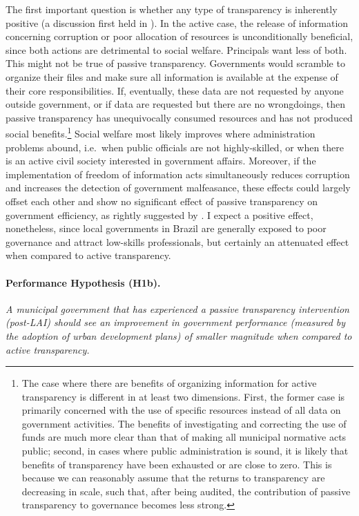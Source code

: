 \documentclass[11pt]{article}
\begin{document}
The first important question is whether any type of transparency is inherently positive (a discussion first held in \citet{PratWrongKindTransparency2005}). In the active case, the release of information concerning corruption or poor allocation of resources is unconditionally beneficial, since both actions are detrimental to social welfare. Principals want less of both. This might not be true of passive transparency. Governments would scramble to organize their files and make sure all information is available at the expense of their core responsibilities. If, eventually, these data are not requested by anyone outside government, or if data are requested but there are no wrongdoings, then passive transparency has unequivocally consumed resources and has not produced social benefits.\footnote{The case where there are benefits of organizing information for active transparency is different in at least two dimensions. First, the former case is primarily concerned with the use of specific resources instead of all data on government activities. The benefits of investigating and correcting the use of funds are much more clear than that of making all municipal normative acts public; second, in cases where public administration is sound, it is likely that benefits of transparency have been exhausted or are close to zero. This is because we can reasonably assume that the returns to transparency are decreasing in scale, such that, after being audited, the contribution of passive transparency to governance becomes less strong.} Social welfare most likely improves where administration problems abound, i.e.~when public officials are not highly-skilled, or when there is an active civil society interested in government affairs. Moreover, if the implementation of freedom of information acts simultaneously reduces corruption and increases the detection of government malfeasance, these effects could largely offset each other and show no significant effect of passive transparency on government efficiency, as rightly suggested by \citet{CordisSunshineDisinfectantEffect2014}. I expect a positive effect, nonetheless, since local governments in Brazil are generally exposed to poor governance and attract low-skills professionals, but certainly an attenuated effect when compared to active transparency.

\paragraph{Performance Hypothesis (H1b).} \emph{A municipal government that has experienced a passive transparency intervention (post-LAI) should see an improvement in government performance (measured by the adoption of urban development plans) of smaller magnitude when compared to active transparency.}\\
\end{document}
